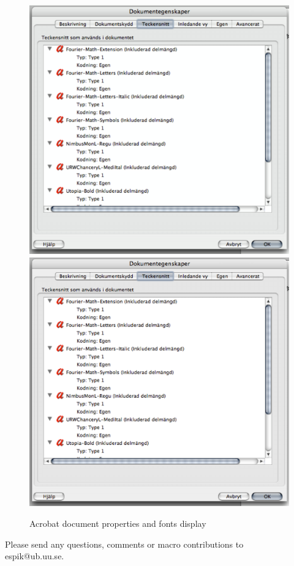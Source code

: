     \begin{figure}[h!]
        \centering
        \ifpdf
            \includegraphics[width=12cm]{Fonts}
        \else
        		\includegraphics[width=12cm]{Fonts.eps}
		\fi
	\caption{Acrobat document properties and fonts display} 
    \end{figure} 

\vspace{\baselineskip}
\noindent Please send any questions, comments or macro contributions to\\espik@ub.uu.se.

